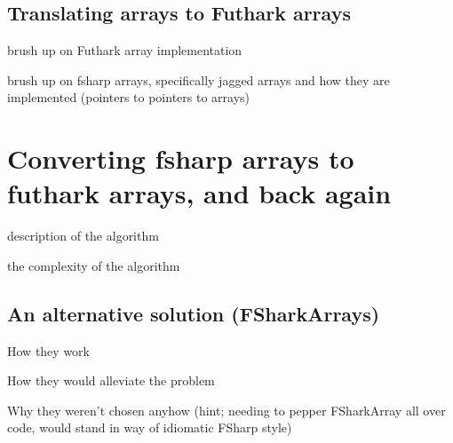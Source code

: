 \subsection*{Translating \fsharp{} arrays to Futhark arrays}
brush up on Futhark array implementation

brush up on fsharp arrays, specifically jagged arrays and how they are
implemented (pointers to pointers to arrays)

\section{Converting fsharp arrays to futhark arrays, and back again}

description of the algorithm

the complexity of the algorithm

\subsection*{An alternative solution (FSharkArrays)}
How they work

How they would alleviate the problem

Why they weren't chosen anyhow (hint; needing to pepper FSharkArray all over
code, would stand in way of idiomatic FSharp style)
%

